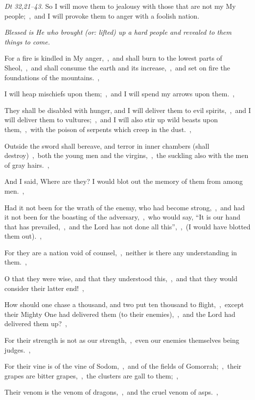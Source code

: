 \documentclass[12pt,twoside,a5paper]{article}
\newcommand{\qanona}[1]{{\liturgicalhint{Qanona.} \emph{#1}}}
\newcommand{\scripture}[1]{\emph{#1.}}
\newcommand{\translationoption}[1]{\emph{or:} #1}
\begin{document}
\begin{normalparskip}
  \scripture{Dt 32,21--43} So I will move them to jealousy with those that are not my My people;~\sep\ and I will provoke them to anger with a foolish nation.

  \qanona{Blessed is He who brought (\translationoption{lifted}) up a hard people and revealed to them things to come.}

  For a fire is kindled in My anger,~\sep\ and shall burn to the lowest parts of Sheol,~\sep\ and shall consume the earth and its increase,~\sep\ and set on fire the foundations of the mountains.~\sep

  I will heap mischiefs upon them;~\sep\ and I will spend my arrows upon them.~\sep

  They shall be disabled with hunger, and I will deliver them to evil spirits,~\sep\ and I will deliver them to vultures;~\sep\ and I will also stir up wild beasts upon them,~\sep\ with the poison of serpents which creep in the dust.~\sep

  Outside the sword shall bereave, and terror in inner chambers (shall destroy)~\sep\ both the young men and the virgins,~\sep\ the suckling also with the men of gray hairs.~\sep

  And I said, Where are they? I would blot out the memory of them from among men.~\sep

  Had it not been for the wrath of the enemy, who had become strong,~\sep\ and had it not been for the boasting of the adversary,~\sep\ who would say, ``It is our hand that has prevailed,~\sep\ and the Lord has not done all this'',~\sep\ (I would have blotted them out).~\sep

  For they are a nation void of counsel,~\sep\ neither is there any understanding in them.~\sep

  O that they were wise, and that they understood this,~\sep\ and that they would consider their latter end!~\sep

  How should one chase a thousand, and two put ten thousand to flight,~\sep\ except their Mighty One had delivered them (to their enemies),~\sep\ and the Lord had delivered them up?~\sep

  For their strength is not as our strength,~\sep\ even our enemies themselves being judges.~\sep

  For their vine is of the vine of Sodom,~\sep\ and of the fields of Gomorrah;~\sep\ their grapes are bitter grapes,~\sep\ the clusters are gall to them;~\sep

  Their venom is the venom of dragons,~\sep\ and the cruel venom of asps.~\sep


\end{normalparskip}
\end{document}
